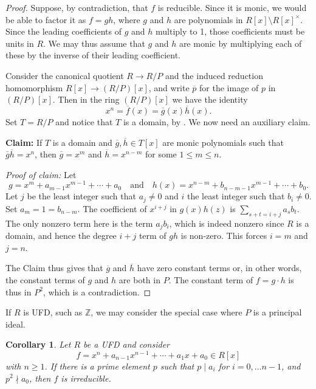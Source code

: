 \documentclass[12pt]{report}
\newtheorem{corollary}[theorem]{Corollary}
\numberwithin{equation}{section}
\numberwithin{theorem}{chapter}
\theoremstyle{definition}
\newtheorem*{basic properties}{Basic Properties}
\newtheorem*{Important Remark}{Important Remark}
\begin{document}
\begin{proof} 
Suppose, by contradiction, that $f$ is reducible. Since it is monic, we would be able to factor it as $f = gh$, where $g$ and $h$ are polynomials in $R[x]\setminus R[x]^\times$. Since the leading coefficients of $g$ and $h$ multiply to 1, those coefficients must be units in $R$. We may thus assume that $g$ and $h$ are monic by multiplying each of these by the inverse of their leading coefficient.

Consider the canonical quotient $R \to R/P$ and the induced reduction homomorphism $R[x] \to (R/P)[x]$, and write $\overline{p}$ for the image of $p$ in $(R/P)[x]$. Then in the ring $(R/P)[x]$ we have the identity 
$$x^n = \overline{f}(x) = \overline{g}(x)\overline{h}(x).$$ 
Set $T=R/P$ and notice that $T$ is a domain, by . We now need an auxiliary claim.

{\bf Claim:} If $T$ is a domain and $\overline{g}, \overline{h} \in T[x]$ are monic polynomials such that $\overline{g} \overline{h} = x^n$, then $\overline{g} = x^m$ and $\overline{h} = x^{n-m}$ for some $1 \leqslant m \leqslant n$.

{\em Proof of claim:}  Let 
$$g = x^m + a_{m-1} x^{m-1} + \cdots + a_0 \quad \text{and} \quad h(x) = x^{n-m} + b_{n-m-1} x^{m-1} + \cdots +  b_0.$$ 
Let $j$ be the least integer such that $a_j \neq 0$ and $i$ the least integer such that $b_i \neq 0$. Set $a_m =1 = b_{n-m}$.
The coefficient of $x^{i+j}$ in $g(x) h(z)$ is $\sum_{s + t = i +j} a_s b_t$. The only nonzero term here is the term $a_j b_i$, which is indeed nonzero since $R$ is a domain, and hence the degree $i+j$ term of $g h$ is non-zero. This forces $i = m$ and  $j = n$.

The Claim thus gives that $\overline{g}$ and $\overline{h}$ have zero constant terms or, in other words, the constant terms of $g$ and $h$ are both in $P$. The constant term of $f = g \cdot h$ is thus in $P^2$, which is a contradiction.
\end{proof}


If $R$ is UFD, such as $\mathbb{Z}$, we may consider the special case where $P$ is a principal ideal.


\begin{corollary} 
Let $R$ be a UFD and consider 
$$f = x^n + a_{n-1} x^{n-1} + \cdots + a_1 x + a_0 \in R[x]$$ 
with $n \geqslant 1$. If there is a prime element $p$ such that $p \mid a_i$ for $i = 0, \dots n-1$, and $p^2 \nmid a_0$, then $f$ is irreducible.
\end{corollary}
\end{document}
